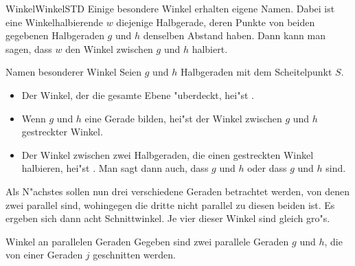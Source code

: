 \begin{MXContent}{Winkel}{Winkel}{STD}
Einige besondere Winkel erhalten eigene Namen.
Dabei ist eine Winkelhalbierende $w$ diejenige Halbgerade, deren Punkte von 
beiden gegebenen Halbgeraden $g$ und $h$ denselben Abstand haben. Dann kann 
man sagen, dass $w$ den Winkel zwischen $g$ und $h$ halbiert.

\begin{MXInfo}{Namen besonderer Winkel}
Seien $g$ und $h$ Halbgeraden mit dem Scheitelpunkt $S$.
\begin{itemize}
\item
Der Winkel, der die gesamte Ebene "uberdeckt, hei"st 
.
\item
Wenn $g$ und $h$ eine Gerade bilden, hei"st der Winkel zwischen $g$ und $h$
gestreckter Winkel.
\item
Der Winkel zwischen zwei Halbgeraden, die einen gestreckten Winkel halbieren,
hei"st . 
Man sagt dann auch, dass $g$ und $h$ 
 oder dass 
$g$ und $h$  sind. 
\end{itemize}
\end{MXInfo}

Als N"achstes sollen nun drei verschiedene Geraden betrachtet werden, 
von denen zwei parallel sind, wohingegen die dritte nicht parallel zu diesen 
beiden ist. Es ergeben sich dann acht Schnittwinkel.
Je vier dieser Winkel sind gleich gro"s.

\begin{MXInfo}{Winkel an parallelen Geraden}%
%
Gegeben sind zwei parallele Geraden $g$ und $h$, die von einer Geraden $j$ 
geschnitten werden.


\end{MXInfo}
\end{MXContent}
